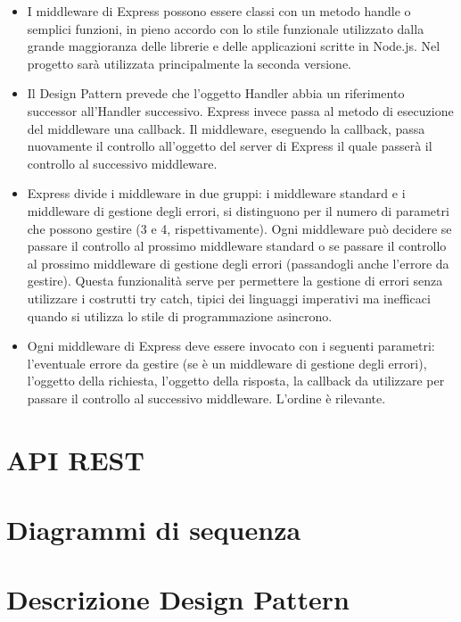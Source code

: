 \documentclass[12pt,a4paper]{article}
\begin{document}
\begin{itemize}
	\item I middleware di Express possono essere classi con un metodo handle o semplici funzioni, in pieno accordo con lo stile funzionale utilizzato dalla grande maggioranza delle librerie e delle applicazioni scritte in Node.js. Nel progetto sarà utilizzata principalmente la seconda versione.
	\item Il Design Pattern prevede che l’oggetto Handler abbia un riferimento successor all’Handler successivo. Express invece passa al metodo di esecuzione del middleware una callback. Il middleware, eseguendo la callback, passa nuovamente il controllo all’oggetto del server di Express il quale passerà il controllo al successivo middleware.
	\item Express divide i middleware in due gruppi: i middleware standard e i middleware di gestione degli errori, si distinguono per il numero di parametri che possono gestire (3 e 4, rispettivamente). Ogni middleware può decidere se passare il controllo al prossimo middleware standard o se passare il controllo al prossimo middleware di gestione degli errori (passandogli anche l’errore da gestire). Questa funzionalità serve per permettere la gestione di errori senza utilizzare i costrutti try catch, tipici dei linguaggi imperativi ma inefficaci quando si utilizza lo stile di programmazione asincrono.
	\item Ogni middleware di Express deve essere invocato con i seguenti parametri: l’eventuale errore da gestire (se è un middleware di gestione degli errori), l’oggetto della richiesta, l’oggetto della risposta, la callback da utilizzare per passare il controllo al successivo middleware. L’ordine è rilevante.
\end{itemize}

\newpage

\section{API REST}


\newpage

\section{Diagrammi di sequenza}

\newpage
\appendix

\section{Descrizione Design Pattern}
\end{document}
